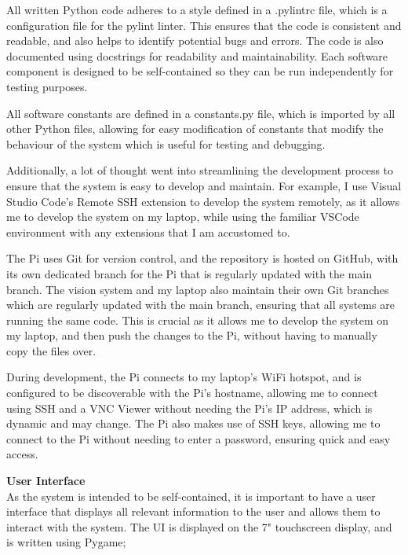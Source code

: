 All written Python code adheres to a style defined in a .pylintrc file, which is a configuration file for the pylint\cite{pylint} linter. This ensures
that the code is consistent and readable, and also helps to identify potential bugs and errors. The code is also documented using docstrings for 
readability and maintainability. Each software component is designed to be self-contained so they can be run independently for testing purposes.

All software constants are defined in a constants.py file, which is imported by all other Python files, allowing for easy modification of constants
that modify the behaviour of the system which is useful for testing and debugging.

Additionally, a lot of thought went into streamlining the development process to ensure that the system is easy to develop and maintain. For example,
I use Visual Studio Code's\cite{vscode} Remote SSH extension to develop the system remotely, as it allows me to develop the system on my laptop, while
using the familiar VSCode environment with any extensions that I am accustomed to.

The Pi uses Git\cite{git} for version control, and the repository is hosted on GitHub\cite{github}, with its own dedicated branch for the Pi that is regularly
updated with the main branch. The vision system and my laptop also maintain their own Git branches which are regularly updated with the main branch, ensuring 
that all systems are running the same code. This is crucial as it allows me to develop the system on my laptop, and then push the changes to the Pi, without
having to manually copy the files over.

During development, the Pi connects to my laptop's WiFi hotspot, and is configured to be discoverable with the Pi's hostname, allowing me to connect using
SSH and a VNC Viewer without needing the Pi's IP address, which is dynamic and may change. The Pi also makes use of SSH keys, allowing me to connect
to the Pi without needing to enter a password, ensuring quick and easy access.

\noindent
\textbf{User Interface} \\
As the system is intended to be self-contained, it is important to have a user interface that displays all relevant information to the user
and allows them to interact with the system. The UI is displayed on the 7" touchscreen display, and is written using Pygame\cite{pygamedoc};

